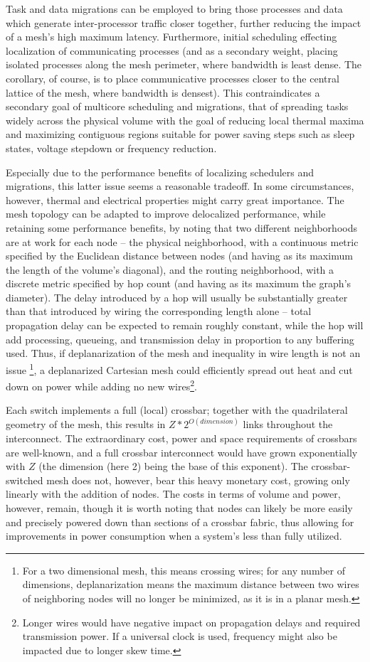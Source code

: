 \documentclass[twocolumn]{article}
\begin{document}
Task and data migrations can be employed to bring those processes and data
which generate inter-processor traffic closer together, further reducing the
impact of a mesh's high maximum latency. Furthermore, initial scheduling effecting
localization of communicating processes (and as a secondary weight,
placing isolated processes along the mesh perimeter, where bandwidth is least
dense. The corollary, of course, is to place communicative processes closer
to the central lattice of the mesh, where bandwidth is densest). This
contraindicates a secondary goal of multicore scheduling and migrations, that
of spreading tasks widely across the physical volume with the goal of reducing
local thermal maxima and maximizing contiguous regions suitable for power
saving steps such as sleep states, voltage stepdown or frequency reduction.

Especially due to the performance benefits of localizing schedulers and
migrations, this latter issue seems a reasonable tradeoff. In some
circumstances, however, thermal and electrical properties might carry great
importance. The mesh topology can be adapted to improve delocalized performance,
while retaining some performance benefits, by noting that two different
neighborhoods are at work for each node -- the physical neighborhood, with a
continuous metric specified by the Euclidean distance between nodes (and having as its 
maximum the length of the volume's diagonal), and the
routing neighborhood, with a discrete metric specified by hop count (and having as its
maximum the graph's diameter). The delay introduced by a hop will usually be
substantially greater than that introduced by wiring the corresponding length
alone -- total propagation delay can be expected to remain roughly constant,
while the hop will add processing, queueing, and transmission delay in
proportion to any buffering used. Thus, if deplanarization of the mesh 
and inequality in wire length is not an issue \footnote{For a two dimensional mesh, this means crossing wires; for any number
of dimensions, deplanarization means the maximum distance between two wires of
neighboring nodes will no longer be minimized, as it is in a planar mesh.},
a deplanarized Cartesian mesh could efficiently spread out heat and cut down on
power while adding no new wires\footnote{Longer wires would have negative
impact on propagation delays and required transmission power. If a universal
clock is used, frequency might also be impacted due to longer skew time.}.

Each switch implements a full (local) crossbar; together with the quadrilateral
geometry of the mesh, this results in $Z*2^{O(dimension)}$ links throughout the
interconnect. The extraordinary cost, power and space requirements of crossbars
are well-known, and a full crossbar interconnect would have grown exponentially
with $Z$ (the dimension (here 2) being the base of this exponent). The crossbar-switched
mesh does not, however, bear this heavy monetary cost, growing only linearly
with the addition of nodes. The costs in terms of volume and power, however,
remain, though it is worth noting that nodes can likely be more easily and
precisely powered down than sections of a crossbar fabric, thus allowing for
improvements in power consumption when a system's less than fully utilized.
\end{document}

